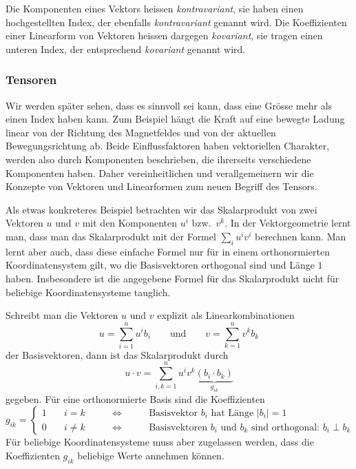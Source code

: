 \begin{definition}
Die Komponenten eines Vektors heissen {\em kontravariant}, sie haben
%
einen hochgestellten Index, der ebenfalls {\em kontravariant} genannt
wird.
Die Koeffizienten einer Linearform von Vektoren heissen dargegen
{\em kovariant}, sie tragen einen unteren Index, der entsprechend
%
{\em kovariant} genannt wird.
\end{definition}

%
%
\subsubsection{Tensoren}
Wir werden später sehen, dass es sinnvoll sei kann, dass eine Grösse
mehr als einen Index haben kann.
Zum Beispiel hängt die Kraft auf eine bewegte Ladung linear von der
Richtung des Magnetfeldes und von der aktuellen Bewegungsrichtung ab.
Beide Einflussfaktoren haben vektoriellen Charakter, werden also durch
Komponenten beschrieben, die ihrerseits verschiedene Komponenten haben.
Daher vereinheitlichen und verallgemeinern wir die Konzepte von Vektoren
und Linearformen zum neuen Begriff des Tensors.

Als etwas konkreteres Beispiel betrachten wir das Skalarprodukt von
zwei Vektoren $u$ und $v$ mit den Komponenten $u^i$ bzw.~$v^k$.
In der Vektorgeometrie lernt man, dass man das Skalarprodukt mit der
Formel $\sum_i u^iv^i$ berechnen kann.
Man lernt aber auch, dass diese einfache Formel nur für in einem
orthonormierten Koordinatensystem gilt, wo die Basisvektoren
orthogonal sind und Länge $1$ haben.
Insbesondere ist die angegebene Formel für das Skalarprodukt nicht
für beliebige Koordinatensysteme tauglich.

Schreibt man die Vektoren $u$ und $v$ explizit als Linearkombinationen
\[
u = \sum_{i=1}^n u^i b_i
\qquad\text{und}\qquad
v = \sum_{k=1}^n v^k b_k
\]
der Basisvektoren, dann ist das Skalarprodukt durch
\[
u\cdot v
=
\sum_{i,k=1}^n u^iv^k \underbrace{(b_i\cdot b_k)}_{\displaystyle g_{ik}}
\]
gegeben.
Für eine orthonormierte Basis sind die Koeffizienten
\[
g_{ik}
=
\left\{
\begin{array}{llcl}
1&\quad i=k&\qquad\Leftrightarrow\qquad&\text{Basisvektor $b_i$ hat Länge $|b_i|=1$}\\
0&\quad i\ne k&\qquad\Leftrightarrow\qquad&\text{Basisvektoren $b_i$ und $b_k$ sind orthogonal: $b_i\perp b_k$}
\end{array}
\right.
\]
Für beliebige Koordinatensysteme muss aber zugelassen werden, dass 
die Koeffizienten $g_{ik}$ beliebige Werte annehmen können.

